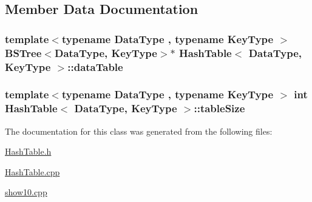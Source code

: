 \subsection{\-Member \-Data \-Documentation}
\hypertarget{class_hash_table_a1bff814c04c4dd2f0db26f2387557006}{
\subsubsection[{data\-Table}]{\setlength{\rightskip}{0pt plus 5cm}template$<$typename Data\-Type , typename Key\-Type $>$ {\bf \-B\-S\-Tree}$<$\-Data\-Type, \-Key\-Type$>$$\ast$ {\bf \-Hash\-Table}$<$ \-Data\-Type, \-Key\-Type $>$\-::{\bf data\-Table}}}\label{class_hash_table_a1bff814c04c4dd2f0db26f2387557006}
\hypertarget{class_hash_table_a5b2aa73ce05cee50154f418eab43530b}{
\subsubsection[{table\-Size}]{\setlength{\rightskip}{0pt plus 5cm}template$<$typename Data\-Type , typename Key\-Type $>$ int {\bf \-Hash\-Table}$<$ \-Data\-Type, \-Key\-Type $>$\-::{\bf table\-Size}}}\label{class_hash_table_a5b2aa73ce05cee50154f418eab43530b}


\-The documentation for this class was generated from the following files\-:\begin{DoxyCompactItemize}
\item 
\hyperlink{_hash_table_8h}{\-Hash\-Table.\-h}\item 
\hyperlink{_hash_table_8cpp}{\-Hash\-Table.\-cpp}\item 
\hyperlink{show10_8cpp}{show10.\-cpp}\end{DoxyCompactItemize}
